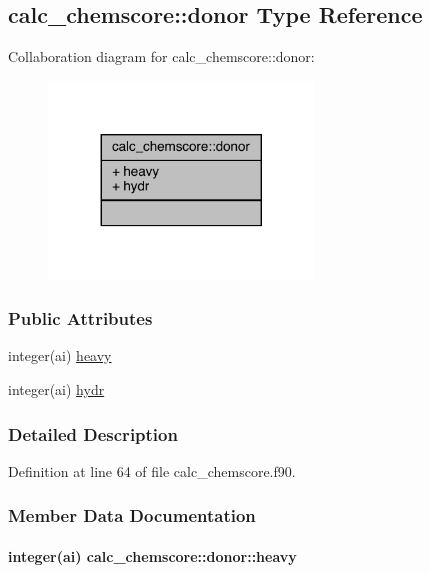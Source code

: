 \hypertarget{structcalc__chemscore_1_1donor}{\subsection{calc\-\_\-chemscore\-:\-:donor Type Reference}
\label{structcalc__chemscore_1_1donor}
}


Collaboration diagram for calc\-\_\-chemscore\-:\-:donor\-:
\nopagebreak
\begin{figure}[H]
\begin{center}
\leavevmode
\includegraphics[width=200pt]{structcalc__chemscore_1_1donor__coll__graph}
\end{center}
\end{figure}
\subsubsection*{Public Attributes}
\begin{DoxyCompactItemize}
\item 
integer(ai) \hyperlink{structcalc__chemscore_1_1donor_a4ffd17153393226a1837e6ec593fd1c0}{heavy}
\item 
integer(ai) \hyperlink{structcalc__chemscore_1_1donor_a4d1a0a2acb614f07bf76ea0024cc5fad}{hydr}
\end{DoxyCompactItemize}


\subsubsection{Detailed Description}


Definition at line 64 of file calc\-\_\-chemscore.\-f90.



\subsubsection{Member Data Documentation}
\hypertarget{structcalc__chemscore_1_1donor_a4ffd17153393226a1837e6ec593fd1c0}{
\paragraph[{heavy}]{\setlength{\rightskip}{0pt plus 5cm}integer(ai) calc\-\_\-chemscore\-::donor\-::heavy}}\label{structcalc__chemscore_1_1donor_a4ffd17153393226a1837e6ec593fd1c0}


